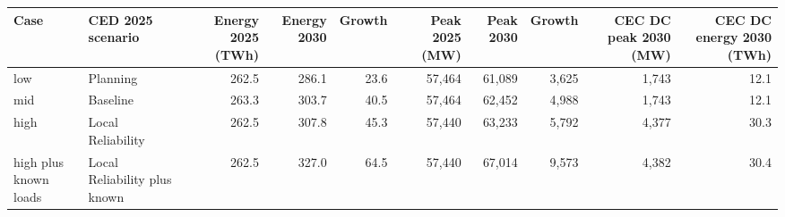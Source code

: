 \begin{tabular}{llrrrrrrrr}
\toprule
Case & CED 2025 scenario & Energy 2025 (TWh) & Energy 2030 & Growth & Peak 2025 (MW) & Peak 2030 & Growth & CEC DC peak 2030 (MW) & CEC DC energy 2030 (TWh) \\
\midrule
low & Planning & 262.5 & 286.1 & 23.6 & 57,464 & 61,089 & 3,625 & 1,743 & 12.1 \\
mid & Baseline & 263.3 & 303.7 & 40.5 & 57,464 & 62,452 & 4,988 & 1,743 & 12.1 \\
high & Local Reliability & 262.5 & 307.8 & 45.3 & 57,440 & 63,233 & 5,792 & 4,377 & 30.3 \\
high plus known loads & Local Reliability plus known & 262.5 & 327.0 & 64.5 & 57,440 & 67,014 & 9,573 & 4,382 & 30.4 \\
\bottomrule
\end{tabular}